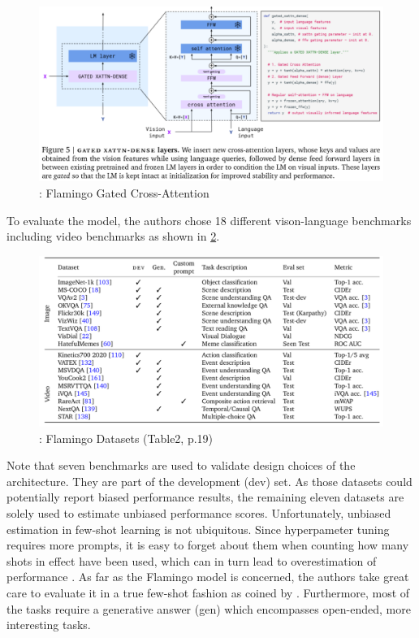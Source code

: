 \documentclass[
]{krantz}
\begin{document}
\begin{figure}

{\centering \includegraphics[width=1\linewidth]{figures/05-chapter2/flamingoattention} 

}

\caption{\citet{alayrac2022flamingo}: Flamingo Gated Cross-Attention}\label{fig:flamingoattention}
\end{figure}



To evaluate the model, the authors chose 18 different vison-language benchmarks including video benchmarks as shown in \ref{fig:flamingodatasets}.

\begin{figure}

{\centering \includegraphics[width=1\linewidth]{figures/05-chapter2/flamingodatasets} 

}

\caption{\citet{alayrac2022flamingo}: Flamingo Datasets (Table2, p.19)}\label{fig:flamingodatasets}
\end{figure}



Note that seven benchmarks are used to validate design choices of the architecture. They are part of the development (dev) set. As those datasets could potentially report biased performance results, the remaining eleven datasets are solely used to estimate unbiased performance scores. Unfortunately, unbiased estimation in few-shot learning is not ubiquitous. Since hyperpameter tuning requires more prompts, it is easy to forget about them when counting how many shots in effect have been used, which can in turn lead to overestimation of performance \citep{perez2021true}. As far as the Flamingo model is concerned, the authors take great care to evaluate it in a true few-shot fashion as coined by \citet{perez2021true}. Furthermore, most of the tasks require a generative answer (gen) which encompasses open-ended, more interesting tasks.
\end{document}
